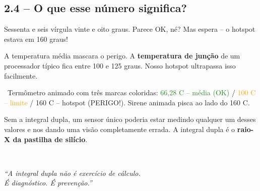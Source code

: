 \subsection{2.4 -- O que esse número significa?}

\begin{fala}
Sessenta e seis vírgula vinte e oito graus. Parece OK, né?
Mas espera -- o hotspot estava em 160 graus!
\end{fala}

\begin{fala}
A temperatura média mascara o perigo. A \textbf{temperatura de junção}
de um processador típico fica entre 100 e 125 graus.
Nosso hotspot ultrapassa isso facilmente.
\end{fala}

\begin{visual}
\faFilm\ Termômetro animado com três marcas coloridas:
\textcolor{ForestGreen}{66,28 {\textdegree}C -- média (OK)} /
\textcolor{Orange}{100 {\textdegree}C -- limite} /
\textcolor{corAlerta}{160 {\textdegree}C -- hotspot (PERIGO!)}.
Sirene animada pisca ao lado do 160 {\textdegree}C.
\end{visual}

\begin{fala}
Sem a integral dupla, um sensor único poderia estar medindo qualquer
um desses valores e nos dando uma visão completamente errada.
A integral dupla é o \textbf{raio-X da pastilha de silício}.
\end{fala}

\begin{tela}
\faDesktop\
\begin{center}
\large\itshape
``A integral dupla não é exercício de cálculo.\\
É diagnóstico. É prevenção.''
\end{center}
\end{tela}